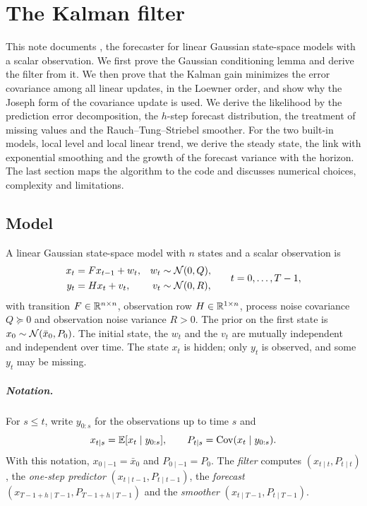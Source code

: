 \chapter{The Kalman filter}\label{ch:kf}

This note documents , the  forecaster for linear
Gaussian state-space models with a scalar observation. We first prove the Gaussian
conditioning lemma and derive the filter from it. We then prove that the Kalman gain
minimizes the error covariance among all linear updates, in the Loewner order, and
show why the Joseph form of the covariance update is used. We derive the
likelihood by the prediction error decomposition, the $h$-step forecast
distribution, the treatment of missing values and the Rauch--Tung--Striebel
smoother. For the two built-in models, local level and local linear trend, we
derive the steady state, the link with exponential smoothing and the growth of
the forecast variance with the horizon. The last section maps the algorithm to
the code and discusses numerical choices, complexity and limitations.




\section{Model}

A linear Gaussian state-space model with $n$ states and a scalar observation is
\begin{equation}\label{kf:eq:model}
\begin{aligned}
  x_t &= F x_{t-1} + w_t, & w_t &\sim \mathcal{N}(0, Q),\\
  y_t &= H x_t + v_t,     & v_t &\sim \mathcal{N}(0, R),
\end{aligned}
\qquad t = 0,\dots,T-1,
\end{equation}
with transition $F\in\mathbb{R}^{n\times n}$, observation row $H\in\mathbb{R}^{1\times n}$,
process noise covariance $Q\succeq0$ and observation noise variance $R>0$. The
prior on the first state is $x_0\sim\mathcal{N}(\bar x_0, P_0)$. The initial state, the
$w_t$ and the $v_t$ are mutually independent and independent over time. The state
$x_t$ is hidden; only $y_t$ is observed, and some $y_t$ may be missing.

\paragraph{Notation.} For $s\le t$, write $y_{0:s}$ for the observations up
to time $s$ and
\[
  x_{t\mid s} = \mathbb{E}[x_t\mid y_{0:s}],\qquad P_{t\mid s} = \operatorname{Cov}(x_t\mid y_{0:s}).
\]
With this notation, $x_{0\mid -1}=\bar x_0$ and $P_{0\mid -1}=P_0$. The \emph{filter} computes
$(x_{t\mid t},P_{t\mid t})$, the \emph{one-step predictor} $(x_{t\mid t-1},P_{t\mid t-1})$,
the \emph{forecast} $(x_{T-1+h\mid T-1},P_{T-1+h\mid T-1})$ and the \emph{smoother}
$(x_{t\mid T-1},P_{t\mid T-1})$.

